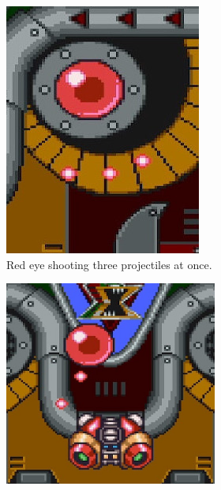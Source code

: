 \begin{figure}[htp]
\begin{figure}[htp]
\begin{subfigure}[t]{0.30\linewidth}
		\includegraphics[width=\linewidth]{figures/X1/Sigma_stages/Rangda_red_1.jpg}
		\caption{Red eye shooting three projectiles at once.}
	\end{subfigure}
	\begin{subfigure}{0.40\linewidth}
		\centering
		\includegraphics[width=\linewidth]{figures/X1/Sigma_stages/Rangda_red_2.jpg}

\end{subfigure}
\end{figure}
\end{figure}
